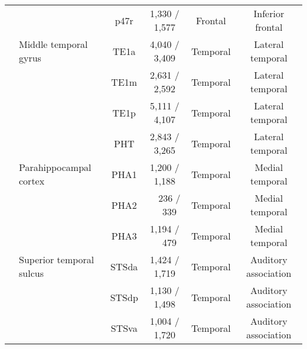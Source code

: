 \begin{table*}[t]
{\begin{tabular}{ l | l | c | c | c | c }
                                      &                                 & p47r                  & 1,330 / 1,577         & Frontal               & Inferior frontal                          \\
                                      \cmidrule{2-6}
                                      & Middle temporal gyrus           & TE1a                  & 4,040 / 3,409         & Temporal              & Lateral temporal                          \\
                                      &                                 & TE1m                  & 2,631 / 2,592         & Temporal              & Lateral temporal                          \\
                                      &                                 & TE1p                  & 5,111 / 4,107         & Temporal              & Lateral temporal                          \\
                                      &                                 & PHT                   & 2,843 / 3,265         & Temporal              & Lateral temporal                          \\
                                      \cmidrule{2-6}
                                      & Parahippocampal cortex          & PHA1                  & 1,200 / 1,188         & Temporal              & Medial temporal                           \\
                                      &                                 & PHA2                  & ~~236 / ~~339         & Temporal              & Medial temporal                           \\
                                      &                                 & PHA3                  & 1,194 / ~~479         & Temporal              & Medial temporal                           \\
                                      \cmidrule{2-6}
                                      & Superior temporal sulcus        & STSda                 & 1,424 / 1,719         & Temporal              & Auditory association                      \\
                                      &                                 & STSdp                 & 1,130 / 1,498         & Temporal              & Auditory association                      \\
                                      &                                 & STSva                 & 1,004 / 1,720         & Temporal              & Auditory association                      \\

\end{tabular}}
\end{table*}
